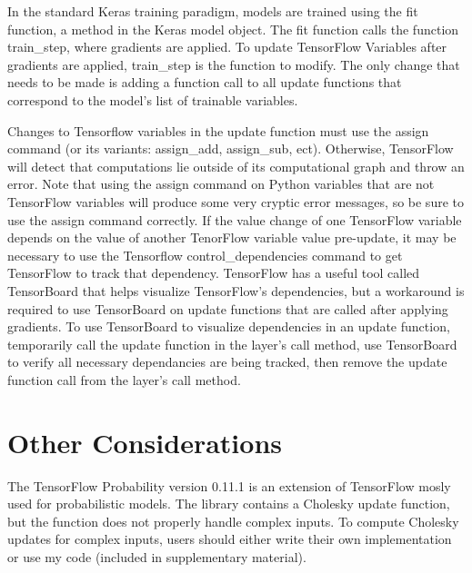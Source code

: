 In the standard Keras training paradigm, models are trained using the fit function, a method in the Keras model object. The fit function calls the function train\_step, where gradients are applied.  To update TensorFlow Variables after gradients are applied, train\_step is the function to modify. The only change that needs to be made is adding a function call to all update functions that correspond to the model's list of trainable variables.


Changes to Tensorflow variables in the update function must use the assign command (or its variants: assign\_add, assign\_sub, ect). Otherwise, TensorFlow will detect that computations lie outside of its computational graph and throw an error. Note that using the assign command on Python variables that are not TensorFlow variables will produce some very cryptic error messages, so be sure to use the assign command correctly. If the value change of one TensorFlow variable depends on the value of another TenorFlow variable value pre-update, it may be necessary to use the Tensorflow control\_dependencies command to get TensorFlow to track that dependency. TensorFlow has a useful tool called TensorBoard that helps visualize TensorFlow's dependencies, but a workaround is required to use TensorBoard on update functions that are called after applying gradients. To use TensorBoard to visualize dependencies in an update function, temporarily call the update function in the layer's call method, use TensorBoard to verify all necessary dependancies are being tracked, then remove the update function call from the layer's call method.

\section{Other Considerations}
The TensorFlow Probability version 0.11.1 \cite{tensorflowprobability} is an extension of TensorFlow mosly used for probabilistic models. The library contains a Cholesky update function, but the function does not properly handle complex inputs. To compute Cholesky updates for complex inputs, users should either write their own implementation or use my code (included in supplementary material).
